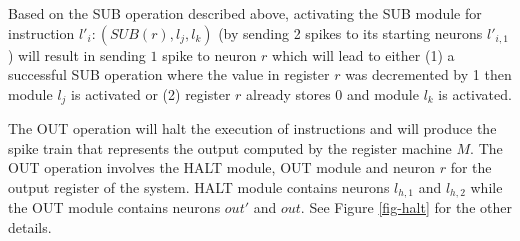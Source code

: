 \documentclass[runningheads,a4paper]{llncs}
\begin{document}

Based on the SUB operation described above, activating the SUB module for instruction $l'_i:(SUB(r),l_j,l_k)$ (by sending 2 spikes to its starting 
neurons  $l'_{i,1}$) will result in sending $1$ spike to neuron $r$ which will lead to either (1) a successful SUB operation where the value in 
register $r$ was decremented by 1 then module $l_j$ is activated or (2) register $r$ already stores 0 and module $l_k$ is activated.


The OUT operation will halt the execution of instructions and will produce the spike train that represents the output computed by the register 
machine $M$. The OUT operation involves the HALT module, OUT module and neuron $r$ for the output register of the system. HALT module contains 
neurons $l_{h,1}$ and $l_{h,2}$ while the OUT module contains neurons $out'$ and $out$. See Figure \ref{fig-halt} for the other details.

   
\end{document}
